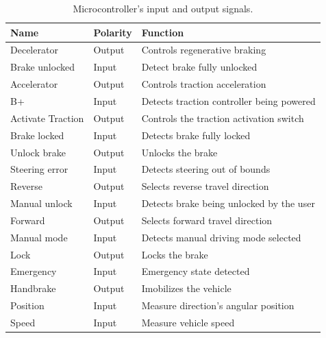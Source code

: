 \documentclass[journal]{IEEEtran}
\begin{document}
\begin{table}[!t]

    \renewcommand{\arraystretch}{1.3}
        \caption{Microcontroller's input and output signals.}
        \label{tab:sinais_uc}
    \centering
    \begin{tabular}{@{}  m{} m{} m{}  @{}}
            \hline
            Name & Polarity & Function\\
            \hline
            Decelerator & Output & Controls regenerative braking \footnotemark[3]\\
            Brake unlocked & Input & Detect brake fully unlocked\\
            Accelerator & Output & Controls traction acceleration \footnotemark[3]\\
            B+ & Input & Detects traction controller being powered\\
            Activate Traction & Output & Controls the traction activation switch \footnotemark[3]\\
            Brake locked & Input & Detects brake fully locked\\
            Unlock brake & Output & Unlocks the brake \footnotemark[4]\\
            Steering error & Input & Detects steering out of bounds\\
            Reverse & Output & Selects reverse travel direction \footnotemark[3]\\
            Manual unlock & Input & Detects brake being unlocked by the user\\
            Forward & Output & Selects forward travel direction \footnotemark[3]\\
            Manual mode & Input & Detects manual driving mode selected\\
            Lock & Output & Locks the brake\\
            Emergency & Input & Emergency state detected\\
            Handbrake & Output & Imobilizes the vehicle \footnotemark[3]\\
            Position & Input & Measure direction's angular position\\
            Speed & Input & Measure vehicle speed\\
            \hline
        \end{tabular}

\end{table}
\end{document}

